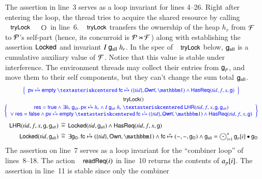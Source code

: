 The assertion in line~3 serves as a loop invariant for lines
4--26. Right after entering the loop, the thread tries to acquire the
shared resource by calling $\aact{tryLock}\eesc{()}$ in
line~6. $\aact{tryLock}$ transfers the ownership of the heap $h_r$ from
$\mathcal{F}$ to $\mathcal{P}$'s self-part (hence, its concurroid is
$\mathcal{P}\rtimes\mathcal{F}$) along with establishing the assertion
$\mathsf{Locked}$ and invariant $I~\mathsf{g}_{\text{all}}~h_r$.
%
In the spec of $\aact{tryLock}$ below, $\mathsf{g}_{\text{all}}$ is a cumulative
auxiliary value of $\mathcal{F}$. Notice that this value is stable under
interference.
%
%
The environment threads may collect their entries from $\mathsf{g}_{p}$, and move
them to their self components, but they can't change the sum total
$\mathsf{g}_{\text{all}}$.
%
\[
{\small
\hspace{-8pt}
\begin{array}{c}
\spec{
\begin{array}{c}
\hpriv \spts \hempty ~\sep~ 
\hfc \spts (\set{\tid}, \lockNown, \pcmU) \aand \requested{\tid, f, x, \g}
\end{array}
}
\\[4pt]
\aact{tryLock}()
\\[2pt]
\spec{
\begin{array}{c}
  \res = \True \aand  \exists h_r~\gall\ldot \hpriv \spts h_r  \aand I~\gall~h_r
  ~\sep~ \lhr{\tid, f, x, \g, \gall} \\
  \oor~ \res = \False \aand \hpriv\spts\hempty ~\sep~ \hfc \spts
  (\set{\tid}, \lockNown, \pcmU) \aand \requested{\tid, f, x, \g}    
\end{array}
}
\end{array}
}
\]
%
%
\[
{\small
\begin{array}{r@{\ }c@{\ }l}
  \lhr{\tid, f, x, \g, \gall} & \eqdef & \locked{\tid, \gall} \aand \requested{\tid, f, x, \g}
\\[5pt]
  \locked{\tid, \gall} & \eqdef & \exists \gO\ldot \hfc \spts (\set{\tid}, \lockOwn, \pcmU) \aand \hfc \opts (-,-,\gO) \aand \gall
  = \jjoin{i}\gp[i] \join \gO
\end{array}
}\]
% 
%
The assertion on line~7 serves as a loop invariant for the ``combiner
loop'' of lines~8--18.
%
%
The action $\aact{readReq}(i)$ in line~10 returns the contents of
$\text{\emph{a}}_p[i]$. The assertion in line~11 is stable since only the combiner
